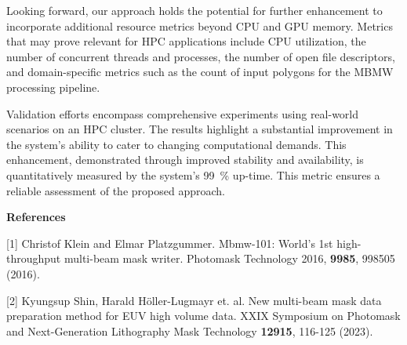 \documentclass[a4paper, 11pt]{article}
\begin{document}
Looking forward, our approach holds the potential for further enhancement to incorporate additional resource metrics beyond CPU and GPU memory. 
Metrics that may prove relevant for HPC applications include CPU utilization, the number of concurrent threads and processes, the number of open file descriptors, and domain-specific metrics such as the count of input polygons for the MBMW processing pipeline.

Validation efforts encompass comprehensive experiments using real-world scenarios on an HPC cluster.
The results highlight a substantial improvement in the system's ability to cater to changing computational demands.
This enhancement, demonstrated through improved stability and availability, is quantitatively measured by the system's 99~\% up-time.
This metric ensures a reliable assessment of the proposed approach.

\vspace{4ex}
{\bf{References}}
\begin{reflist}
  \item [{[1]}] Christof Klein and Elmar Platzgummer. Mbmw-101: World’s 1st high-throughput multi-beam mask writer. Photomask Technology 2016, \textbf{9985}, 998505 (2016).
  \item [{[2]}] Kyungsup Shin, Harald Höller-Lugmayr et. al. New multi-beam mask data preparation method for EUV high volume data. XXIX Symposium on Photomask and Next-Generation Lithography Mask Technology \textbf{12915}, 116-125 (2023).
\end{reflist}
\end{document}
